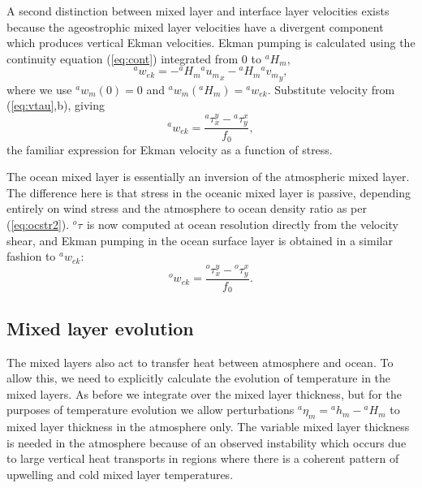 \documentclass[11pt, a4paper,twoside]{article}
\newcommand{\etb}[2]{{{}^{#1}\eta_{#2}}}
\newcommand{\uu}[2]{{{}^{#1}u_{#2}}}
\newcommand{\vv}[2]{{{}^{#1}v_{#2}}}
\newcommand{\ww}[2]{{{}^{#1}w_{#2}}}
\newcommand{\ek}[1]{{{}^{#1}w_{ek}}}
\newcommand{\HH}[2]{{{}^{#1}H_{#2}}}
\newcommand{\h}[2]{{{}^{#1}h_{#2}}}
\newcommand{\tx}[2]{{}^{#1}\tau^{#2}}
\numberwithin{equation}{section}
\begin{document}
A second distinction between mixed layer and interface layer velocities exists because the ageostrophic mixed layer velocities have a divergent component which produces vertical Ekman velocities.
Ekman pumping is calculated using the continuity equation (\ref{eq:cont}) integrated from $0$ to $\HH{a}{m}$,
\begin{equation}\label{eq:wek1}
 \ek{a} = - \HH{a}{m} \uu{a}{m}_x - \HH{a}{m} \vv{a}{m}_y,
\end{equation}
where we use $\ww{a}{m}(0)=0$ and $\ww{a}{m}(\HH{a}{m}) = \ek{a}$.
Substitute velocity from (\ref{eq:vtau},b), giving
\begin{equation}\label{eq:atek}
\ek{a}  = \frac{\tx{a}{y}_x - \tx{a}{x}_y}{f_0},
\end{equation}
the familiar expression for Ekman velocity as a function of stress.

The ocean mixed layer is essentially an inversion of the atmospheric mixed layer.
The difference here is that stress in the oceanic mixed layer is passive,  depending entirely on wind stress and the atmosphere to ocean density ratio as per (\ref{eq:ocstr2}).
$\tx{o}{}$ is now computed at ocean resolution directly from the velocity shear,
and Ekman pumping in the ocean surface layer is obtained in a similar fashion to $\ek{a}$:
\begin{equation}\label{eq:ocek}
\ek{o}  = \frac{\tx{o}{y}_x - \tx{o}{x}_y}{f_0}.
\end{equation}


\subsection{Mixed layer evolution}
The mixed layers also act to transfer heat between atmosphere and ocean.
To allow this, we need to explicitly calculate the evolution of temperature in the mixed layers.
As before we integrate over the mixed layer thickness,  but for the purposes of temperature evolution we allow perturbations $\etb{a}{m} = \h{a}{m} - \HH{a}{m} $ to mixed layer thickness in the atmosphere only.
The variable mixed layer thickness is needed in the atmosphere because of an observed instability which occurs due to large vertical heat transports in regions where there is a coherent pattern of upwelling and cold mixed layer temperatures.
\end{document}
